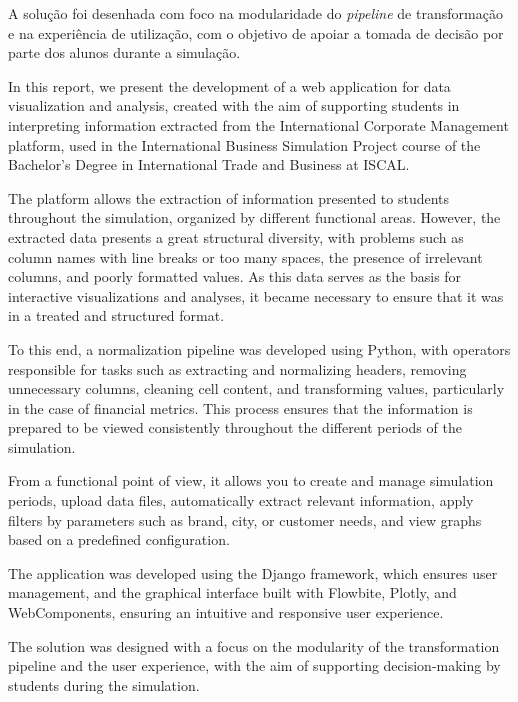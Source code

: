 A solução foi desenhada com foco na modularidade do \textit{pipeline} de transformação e na experiência de utilização, com o objetivo de apoiar a tomada de decisão por parte dos alunos durante a simulação.


In this report, we present the development of a web application for data visualization and analysis, created with the aim of supporting students in interpreting information extracted from the International Corporate Management platform, used in the International Business Simulation Project course of the Bachelor's Degree in International Trade and Business at ISCAL.

The platform allows the extraction of information presented to students throughout the simulation, organized by different functional areas. However, the extracted data presents a great structural diversity, with problems such as column names with line breaks or too many spaces, the presence of irrelevant columns, and poorly formatted values. As this data serves as the basis for interactive visualizations and analyses, it became necessary to ensure that it was in a treated and structured format. 

To this end, a normalization pipeline was developed using Python, with operators responsible for tasks such as extracting and normalizing headers, removing unnecessary columns, cleaning cell content, and transforming values, particularly in the case of financial metrics. This process ensures that the information is prepared to be viewed consistently throughout the different periods of the simulation.

From a functional point of view, it allows you to create and manage simulation periods, upload data files, automatically extract relevant information, apply filters by parameters such as brand, city, or customer needs, and view graphs based on a predefined configuration.

The application was developed using the Django framework, which ensures user management, and the graphical interface built with Flowbite, Plotly, and WebComponents, ensuring an intuitive and responsive user experience.

The solution was designed with a focus on the modularity of the transformation pipeline and the user experience, with the aim of supporting decision-making by students during the simulation.